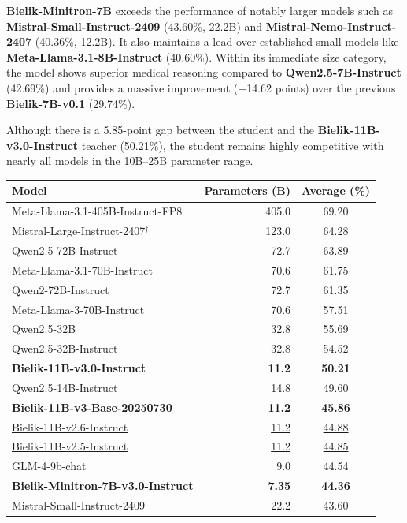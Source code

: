 \documentclass{article}
\begin{document}
\textbf{Bielik-Minitron-7B} exceeds the performance of notably larger models such as \textbf{Mistral-Small-Instruct-2409} (43.60\%, 22.2B) and \textbf{Mistral-Nemo-Instruct-2407} (40.36\%, 12.2B). It also maintains a lead over established small models like \textbf{Meta-Llama-3.1-8B-Instruct} (40.60\%). Within its immediate size category, the model shows superior medical reasoning compared to \textbf{Qwen2.5-7B-Instruct} (42.69\%) and provides a massive improvement (+14.62 points) over the previous \textbf{Bielik-7B-v0.1} (29.74\%).

Although there is a 5.85-point gap between the student and the \textbf{Bielik-11B-v3.0-Instruct} teacher (50.21\%), the student remains highly competitive with nearly all models in the 10B--25B parameter range.

\begin{table}[t]
    \centering
    \small
    \begin{tabular}{lrc}
    \toprule
    \textbf{Model} & \textbf{Parameters (B)} & \textbf{Average (\%)} \\
    \midrule
    Meta-Llama-3.1-405B-Instruct-FP8 & 405.0 & 69.20 \\
    Mistral-Large-Instruct-2407$^{\dagger}$ & 123.0 & 64.28 \\
    Qwen2.5-72B-Instruct & 72.7 & 63.89 \\
    Meta-Llama-3.1-70B-Instruct & 70.6 & 61.75 \\
    Qwen2-72B-Instruct & 72.7 & 61.35 \\
    Meta-Llama-3-70B-Instruct & 70.6 & 57.51 \\
    Qwen2.5-32B & 32.8 & 55.69 \\
    Qwen2.5-32B-Instruct & 32.8 & 54.52 \\
    \textbf{Bielik-11B-v3.0-Instruct} & \textbf{11.2} & \textbf{50.21} \\
    Qwen2.5-14B-Instruct & 14.8 & 49.60 \\
    \textbf{Bielik-11B-v3-Base-20250730} & \textbf{11.2} & \textbf{45.86} \\
    \underline{Bielik-11B-v2.6-Instruct} & \underline{11.2} & \underline{44.88} \\
    \underline{Bielik-11B-v2.5-Instruct} & \underline{11.2} & \underline{44.85} \\
    GLM-4-9b-chat & 9.0 & 44.54 \\
    \textbf{Bielik-Minitron-7B-v3.0-Instruct} & \textbf{7.35} & \textbf{44.36} \\
    Mistral-Small-Instruct-2409 & 22.2 & 43.60 \\

\end{tabular}
\end{table}
\end{document}
